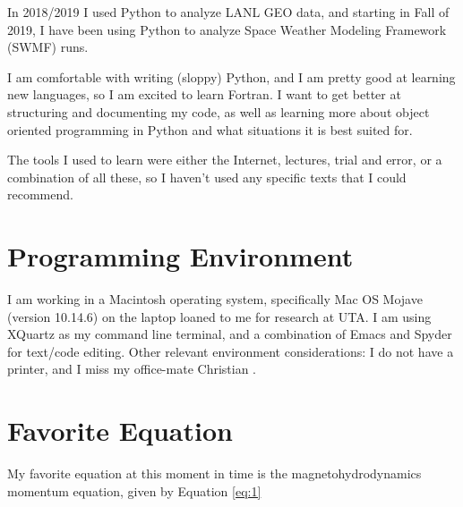 \documentclass[12pt, letterpaper]{article}
\begin{document}
In 2018/2019 I used Python to analyze LANL GEO data, and starting in Fall of 2019, I have been using Python to analyze Space Weather Modeling Framework (SWMF) runs.

I am comfortable with writing (sloppy) Python, and I am pretty good at learning new languages, so I am excited to learn Fortran. I want to get better at structuring and documenting my code, as well as learning more about object oriented programming in Python and what situations it is best suited for.

The tools I used to learn were either the Internet, lectures, trial and error, or a combination of all these, so I haven't used any specific texts that I could recommend.

\section{Programming Environment}


I am working in a Macintosh operating system, specifically Mac OS Mojave (version 10.14.6) on the laptop loaned to me for research at UTA. I am using XQuartz as my command line terminal, and a combination of Emacs and Spyder for text/code editing. Other relevant environment considerations: I do not have a printer, and I miss my office-mate Christian \frownie{}.

\section{Favorite Equation}


My favorite equation at this moment in time is the magnetohydrodynamics momentum equation, given by Equation \ref{eq:1}
\end{document}
